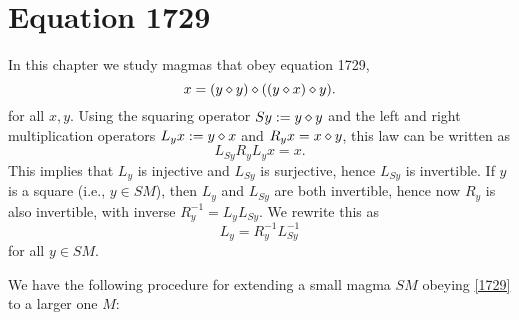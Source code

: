 \chapter{Equation 1729}\label{1729-chapter}

In this chapter we study magmas that obey equation 1729,
\begin{equation}\label{1729}
  x = (y \diamond y) \diamond ((y \diamond x) \diamond y).
\end{equation}
for all $x,y$.  Using the squaring operator $Sy := y \diamond y$ and the left and right multiplication operators $L_y x := y \diamond x$ and $R_y x = x \diamond y$, this law can be written as
$$ L_{Sy} R_y L_{y} x = x.$$
This implies that $L_y$ is injective and $L_{Sy}$ is surjective, hence $L_{Sy}$ is invertible.  If $y$ is a square (i.e., $y \in SM$), then $L_y$ and $L_{Sy}$ are both invertible, hence now $R_y$ is also invertible, with inverse $R_y^{-1} = L_y L_{Sy}$.  We rewrite this as
\begin{equation}\label{lys}
  L_y = R_y^{-1} L_{Sy}^{-1}
\end{equation}
for all $y \in SM$.

We have the following procedure for extending a small magma $SM$ obeying \eqref{1729} to a larger one $M$:

